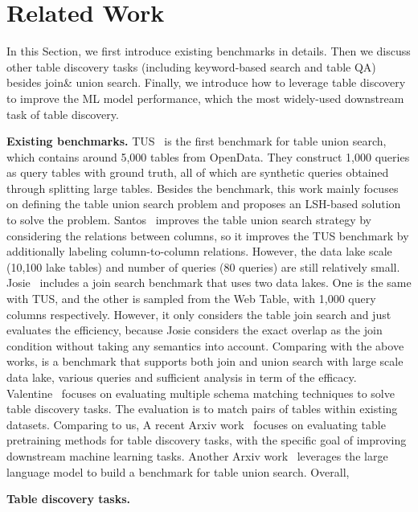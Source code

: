 \section{Related Work}
In this Section, we first introduce existing  benchmarks in details. Then we discuss other table discovery tasks  (including keyword-based search and table QA) besides join\& union search. Finally, we introduce how to leverage table discovery to improve the ML model performance, which the most widely-used downstream task of table discovery. 



\noindent \textbf{Existing benchmarks.} 
TUS~\cite{TUS} is the first benchmark for table union search, which contains around 5,000 tables from OpenData. They construct 1,000 queries  as query tables with ground truth, all of which are synthetic queries obtained through splitting large tables. Besides the benchmark, this work mainly focuses on defining the table union search problem and proposes an LSH-based  solution to solve the problem.
%
Santos~\cite{Santos} improves the table union search strategy by considering the relations between columns, so it improves the  TUS benchmark by additionally labeling column-to-column relations. However, the data lake scale (10,100  lake tables) and number of queries (80 queries) are still relatively small. 
%
Josie~\cite{Josie} includes a join search benchmark that uses two data lakes. One is the same with TUS, and the other is sampled from the Web Table, with 1,000 query columns respectively. However, it only considers the table join search and just evaluates the efficiency, because Josie  considers the exact overlap as the join condition without taking any semantics into account. 
%
Comparing with the above works, \sys is a benchmark that supports both join and union search with large scale data lake, various queries and sufficient analysis in term of the efficacy.
%
Valentine~\cite{valentine} focuses on evaluating multiple schema matching techniques to solve table discovery tasks. The evaluation is to match pairs of tables within  existing datasets. Comparing to us,    
%
A recent Arxiv work~\cite{arxiv} focuses on evaluating table pretraining methods for table
 discovery tasks, with the specific goal of improving downstream machine learning tasks. 
%
Another Arxiv work~\cite{arxiv} leverages the large language model to build a benchmark for table union search.
%
Overall, \sys

\noindent \textbf{Table discovery tasks.}

